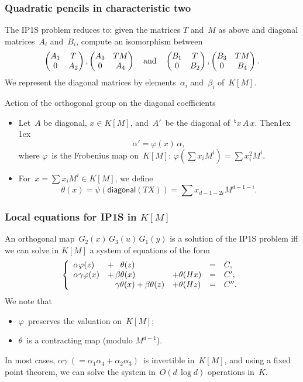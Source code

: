 \documentclass{beamer}%
\def\transpose{{}^{\mathrm{\scriptscriptstyle t}}\!}
\def\mat#1{\begin{pmatrix}#1\end{pmatrix}}
\let\mathrm\mathsf
\begin{document}
\begin{frame}\frametitle{Quadratic pencils in characteristic two}%
The IP1S problem reduces to: given the matrices $T$ and~$M$ as above and
diagonal matrices~$A_i$ and~$B_i$, compute an isomorphism between
\begin{equation*}\belowdisplayskip 1ex
\mat{A_1 & T\\0 & A_2}, \mat{A_3 & TM\\0 & A_4} \quad\text{and}\quad
\mat{B_1 & T\\0 & B_2}, \mat{B_3 & TM\\0 & B_4}.
\end{equation*}
We represent the diagonal matrices by elements~$α_i$ and~$β_i$ of~$K[M]$.

\begin{block}{Action of the orthogonal group on the diagonal coefficients}
\begin{itemize}
\item Let~$A$ be diagonal, $x ∈ K[M]$, and~$A'$~be the diagonal
of~$\transpose{x}\,A\,x$. Then\abovedisplayskip 1ex \belowdisplayskip 1ex
\begin{equation*}
α' = φ(x)\, α,
\end{equation*}
where $φ$~is the Frobenius map on~$K[M]$: $φ(∑ x_i M^i) = ∑ x_i^2 M^i$.
\smallskip
\item For~$x = ∑ x_i M^i ∈ K[M]$, we define
\belowdisplayskip 0pt
\begin{equation*}
θ(x) = ψ(\mathrm{diagonal}(TX)) = ∑ x_{d-1-2i} M^{d-1-i}.
\end{equation*}
\end{itemize}
\end{block}
\end{frame}%
\begin{frame}\frametitle{Local equations for IP1S in $K[M]$}%
An orthogonal map~$G_2(x)\,G_3(u)\, G_1(y)$ is a solution of the IP1S
problem iff we can solve in $K[M]$ a system of equations of the form
\begin{equation*}
\left\{\begin{array}{lllcl}
\alpha \varphi(z) & +\, \hphantom{\beta} \theta(z) &&=&C,\\
\alpha \gamma \varphi(x) & +\,\beta \theta(x) &+\theta(Hx) &=&C',\\
&\hphantom{+\,}\gamma \theta(x) + \beta \theta(z) &+\theta(Hz) &=&C''.
\end{array}\right.\end{equation*}
We note that
\begin{itemize}
\item $φ$~preserves the valuation on~$K[M]$;
\item $θ$~is a contracting map (modulo $M^{d-1}$).
\end{itemize}

In most cases, $α γ \; (= α_1 α_4 + α_2 α_3)$~is invertible in~$K[M]$, and
using a fixed point theorem, we can solve the system in~$O(d\,\log d)$
operations in~$K$.
\end{frame}%
\end{document}
